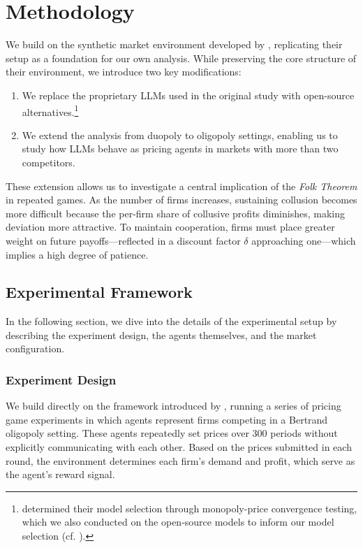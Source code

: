\section{Methodology}\label{sec:meth}

We build on the synthetic market environment developed by \textcite{fish_algorithmic_2025}, replicating their setup as a foundation for our own analysis. While preserving the core structure of their environment, we introduce two key modifications:
\begin{enumerate}
    \item We replace the proprietary LLMs used in the original study with open-source alternatives.\footnote{\noindent\textcite{fish_algorithmic_2025} determined their model selection through monopoly-price convergence testing, which we also conducted on the open-source models to inform our model selection (cf. ).} 
    \item We extend the analysis from duopoly to oligopoly settings, enabling us to study how LLMs behave as pricing agents in markets with more than two competitors. 
\end{enumerate}

These extension allows us to investigate a central implication of the \emph{Folk Theorem} in repeated games. As the number of firms increases, sustaining collusion becomes more difficult because the per-firm share of collusive profits diminishes, making deviation more attractive. To maintain cooperation, firms must place greater weight on future payoffs—reflected in a discount factor $\delta$ approaching one—which implies a high degree of patience.

\subsection{Experimental Framework}

In the following section, we dive into the details of the experimental setup by describing the experiment design, the agents themselves, and the market configuration.

\subsubsection*{Experiment Design}

We build directly on the framework introduced by \textcite{fish_algorithmic_2025}, running a series of pricing game experiments in which agents represent firms competing in a Bertrand oligopoly setting. These agents repeatedly set prices over 300 periods without explicitly communicating with each other. Based on the prices submitted in each round, the environment determines each firm's demand and profit, which serve as the agent’s reward signal.


